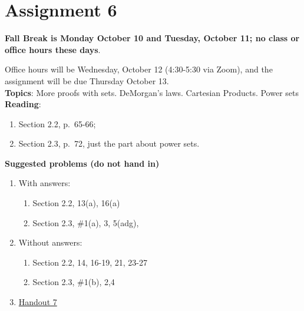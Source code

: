 \documentclass[12pt]{article}
\begin{document}

\newpage
\section[6 (due October 13): More sets. DeMorgan's laws. Cartesian Products. Power sets.]{Assignment 6}

\noindent \textbf{Fall Break is Monday October 10 and Tuesday, October 11; no class or office hours these days}.

\noindent Office hours will be Wednesday, October 12 (4:30-5:30 via Zoom), and the assignment will be due Thursday October 13.
 \\

\noindent \textbf{Topics}: More proofs with sets. DeMorgan's laws. Cartesian Products. Power sets
\\

\noindent \textbf{Reading}:
\begin{enumerate}
\item Section 2.2, p.~65-66; 
\item Section 2.3, p.~72, just the part about
 power sets.
\end{enumerate}





\noindent \textbf{Suggested problems (do not hand in)}
 
\begin{enumerate}
\item With answers:
 \begin{enumerate}
 \item Section 2.2, 13(a), 16(a) 
 \item Section 2.3, \#1(a), 3, 5(adg),
 \end{enumerate}

\item Without answers:
 \begin{enumerate}
 \item Section 2.2, 14, 16-19, 21, 23-27
 \item Section 2.3, \#1(b), 2,4
 \end{enumerate}

 \item \href{https://www.math.emory.edu/~dzb/teaching/250Fall2021/handouts/250-H07-sets-II.pdf}{Handout 7}
\end{enumerate}
\end{document}

